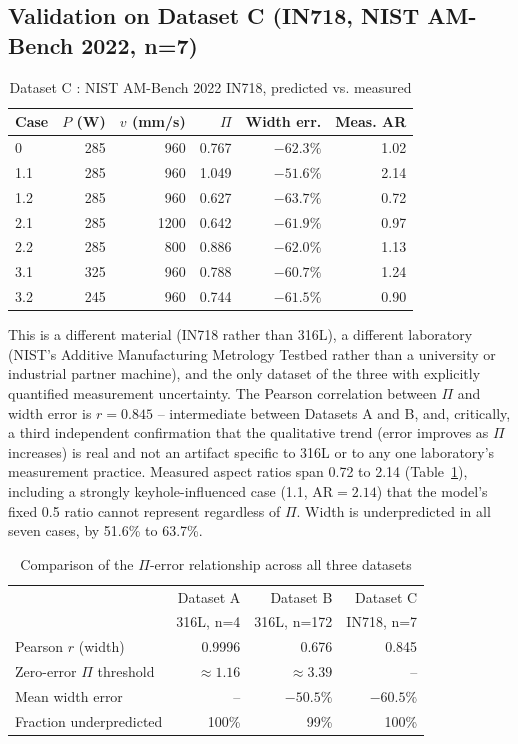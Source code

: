 \documentclass[12pt]{article}
\begin{document}
\subsection{Validation on Dataset C (IN718, NIST AM-Bench 2022, n=7)}

\begin{table}[!t]
\centering
\caption{Dataset C \cite{weaver2024}: NIST AM-Bench 2022 IN718, predicted vs. measured}
\label{tab:validationC}
\begin{tabular}{@{}lrrrrr@{}}
\toprule
Case & $P$ (W) & $v$ (mm/s) & $\Pi$ & Width err. & Meas. AR \\
\midrule
0   & 285 & 960  & 0.767 & $-62.3\%$ & 1.02 \\
1.1 & 285 & 960  & 1.049 & $-51.6\%$ & 2.14 \\
1.2 & 285 & 960  & 0.627 & $-63.7\%$ & 0.72 \\
2.1 & 285 & 1200 & 0.642 & $-61.9\%$ & 0.97 \\
2.2 & 285 & 800  & 0.886 & $-62.0\%$ & 1.13 \\
3.1 & 325 & 960  & 0.788 & $-60.7\%$ & 1.24 \\
3.2 & 245 & 960  & 0.744 & $-61.5\%$ & 0.90 \\
\bottomrule
\end{tabular}
\end{table}

This is a different material (IN718 rather than 316L), a different laboratory (NIST's Additive Manufacturing Metrology Testbed rather than a university or industrial partner machine), and the only dataset of the three with explicitly quantified measurement uncertainty. The Pearson correlation between $\Pi$ and width error is $r=0.845$ -- intermediate between Datasets A and B, and, critically, a third independent confirmation that the qualitative trend (error improves as $\Pi$ increases) is real and not an artifact specific to 316L or to any one laboratory's measurement practice. Measured aspect ratios span 0.72 to 2.14 (Table~\ref{tab:validationC}), including a strongly keyhole-influenced case (1.1, AR$=2.14$) that the model's fixed 0.5 ratio cannot represent regardless of $\Pi$. Width is underpredicted in all seven cases, by 51.6\% to 63.7\%.

\begin{table}[!t]
\centering
\caption{Comparison of the $\Pi$-error relationship across all three datasets}
\label{tab:comparison}
\begin{tabular}{@{}lrrr@{}}
\toprule
 & Dataset A & Dataset B & Dataset C \\
 & 316L, n=4 & 316L, n=172 & IN718, n=7 \\
\midrule
Pearson $r$ (width) & 0.9996 & 0.676 & 0.845 \\
Zero-error $\Pi$ threshold & $\approx 1.16$ & $\approx 3.39$ & -- \\
Mean width error & -- & $-50.5\%$ & $-60.5\%$ \\
Fraction underpredicted & 100\% & 99\% & 100\% \\
\bottomrule
\end{tabular}
\end{table}
\end{document}

